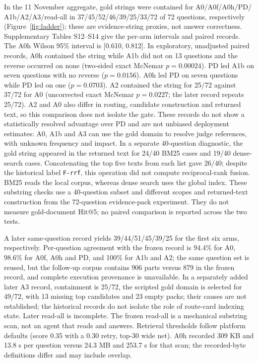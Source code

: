 In the 11 November aggregate, gold strings were contained for A0/A0f/A0h/PD/
A1b/A2/A3/read-all in 37/45/52/46/39/25/33/72 of 72 questions, respectively
(Figure~\ref{fig:ladder}); these are evidence-string proxies, not answer
correctness. Supplementary Tables S12--S14 give the per-arm intervals and
paired records. The A0h Wilson 95\% interval is [0.610, 0.812]. In exploratory,
unadjusted paired records, A0h contained the string while A1b did not on 13
questions and the reverse occurred on none (two-sided exact McNemar
$p=0.00024$). PD led A1b on seven questions with no reverse
($p=0.0156$). A0h led PD on seven questions while PD led on one
($p=0.0703$). A2 contained the string for 25/72 against 37/72 for A0
(uncorrected exact McNemar $p=0.0227$; the later record repeats 25/72). A2 and
A0 also differ in routing, candidate construction and returned text, so this
comparison does not isolate the gate. These records do not show a statistically resolved advantage
over PD and are not unbiased deployment estimates: A0, A1b and A3 can use
the gold domain to resolve judge references, with unknown frequency and impact.
In a separate 40-question diagnostic, the gold string appeared in the
returned text for 24/40 BM25 cases and 19/40 dense-search cases. Concatenating
the top five texts from each list gave 26/40; despite the historical label
\texttt{F-rrf}, this operation did not compute reciprocal-rank fusion. BM25
reads the local corpus, whereas dense search uses the global index. These
substring checks use a 40-question subset and different scopes and returned-text
construction from the 72-question evidence-pack experiment. They do not measure
gold-document Hit@5; no paired comparison is reported across the two tests.

A later same-question record yields 39/44/51/45/39/25 for the first six arms,
respectively. Per-question agreement with the frozen record is 94.4\% for A0,
98.6\% for A0f, A0h and PD, and 100\% for A1b and A2; the same question set
is reused, but the follow-up corpus contains 906 parts versus 879 in the frozen
record, and complete execution provenance is unavailable. In a separately
added later A3 record, containment is 25/72, the scripted gold domain is
selected for 49/72, with 13 missing top candidates and 23 empty packs; their
causes are not established; the historical records do not isolate the role of
route-card indexing state. Later read-all is
incomplete. The frozen read-all is a mechanical substring scan, not an agent
that reads and answers. Retrieval thresholds follow platform defaults (score 0.35 with a 0.30
retry, top-30 wide net).
A0h recorded 309 KB and 13.8 s per question versus
24.3 MB and 253.7 s for that scan; the recorded-byte definitions differ and
may include overlap.


